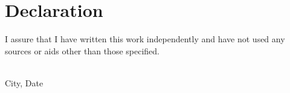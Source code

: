\chapter*{Declaration}

I assure that I have written this work independently and have not used any sources or aids other than those specified.


\quad\\\noindent
City, Date

\quad




